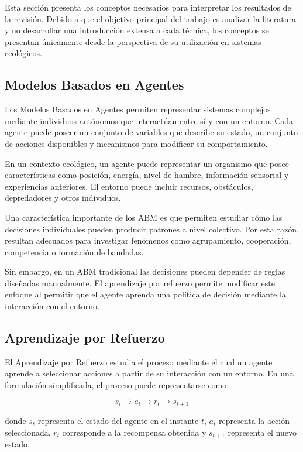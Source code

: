 \documentclass[conference]{IEEEtran}
\begin{document}
Esta sección presenta los conceptos necesarios para interpretar los
resultados de la revisión. Debido a que el objetivo principal del trabajo
es analizar la literatura y no desarrollar una introducción extensa a
cada técnica, los conceptos se presentan únicamente desde la perspectiva
de su utilización en sistemas ecológicos.

\subsection{Modelos Basados en Agentes}

Los Modelos Basados en Agentes permiten representar sistemas complejos
mediante individuos autónomos que interactúan entre sí y con un entorno.
Cada agente puede poseer un conjunto de variables que describe su estado,
un conjunto de acciones disponibles y mecanismos para modificar su
comportamiento.

En un contexto ecológico, un agente puede representar un organismo que
posee características como posición, energía, nivel de hambre,
información sensorial y experiencias anteriores. El entorno puede incluir
recursos, obstáculos, depredadores y otros individuos.

Una característica importante de los ABM es que permiten estudiar cómo
las decisiones individuales pueden producir patrones a nivel colectivo.
Por esta razón, resultan adecuados para investigar fenómenos como
agrupamiento, cooperación, competencia o formación de bandadas.

Sin embargo, en un ABM tradicional las decisiones pueden depender de
reglas diseñadas manualmente. El aprendizaje por refuerzo permite
modificar este enfoque al permitir que el agente aprenda una política de
decisión mediante la interacción con el entorno.

\subsection{Aprendizaje por Refuerzo}

El Aprendizaje por Refuerzo estudia el proceso mediante el cual un agente
aprende a seleccionar acciones a partir de su interacción con un entorno.
En una formulación simplificada, el proceso puede representarse como:

\begin{equation}
s_t \rightarrow a_t \rightarrow r_t \rightarrow s_{t+1}
\end{equation}

donde $s_t$ representa el estado del agente en el instante $t$, $a_t$
representa la acción seleccionada, $r_t$ corresponde a la recompensa
obtenida y $s_{t+1}$ representa el nuevo estado.
\end{document}
